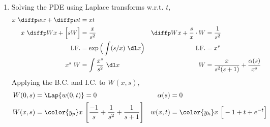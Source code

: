 \begin{enumerate}
    \item Solving the PDE using Laplace transforms w.r.t. $ t $,
          \begin{align}
              x\ \diffp wx + \diffp wt        & = xt                            \\
              x\ \diffp Wx + \Big[sW\Big]     & = \frac{x}{s^2}               &
              \diffp Wx + \frac{s}{x} \cdot W & = \frac{1}{s^2}                 \\
              \text{I.F.}                     & = \exp\Big( \int (s/x)
              \ \dl x \Big)                   &
              \text{I.F.}                     & = x^s                           \\
              x^s\ W                          & = \int \frac{x^s}{s^2}\ \dl x &
              W                               & = \frac{x}{s^2(s+1)}
              + \frac{\alpha(s)}{x^s}
          \end{align}
          Applying the B.C. and I.C. to $ W(x, s) $,
          \begin{align}
              W(0, s)                & = \Lap\{w(0, t)\} = 0                  &
              \alpha(s)              & = 0                                      \\
              W(x, s)                & = \color{y_p} x\ \Bigg[\frac{-1}{s}
                  + \frac{1}{s^2}
              + \frac{1}{s+1} \Bigg] &
              w(x, t)                & = \color{y_h} x\ \Big[ -1 + t + e^{-t}
                  \Big]
          \end{align}


\end{enumerate}
